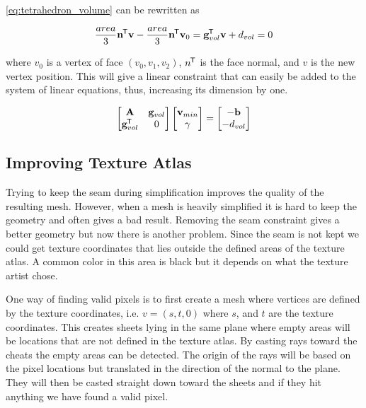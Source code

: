 \cref{eq:tetrahedron_volume} can be rewritten as 

\begin{equation} \label{eq:tetrahedron_volume_rewritten}
\frac{area}{3} \mathbf{n}^{\mkern-1.5mu\mathsf{T}} \mathbf{v} - \frac{area}{3} \mathbf{n}^{\mkern-1.5mu\mathsf{T}} \mathbf{v}_0 = \mathbf{g}_{vol}^{\mkern-1.5mu\mathsf{T}} \mathbf{v} + d_{vol} = 0
\end{equation}


where $v_0$ is a vertex of face $(v_0, v_1, v_2)$, $n^{\mkern-1.5mu\mathsf{T}}$ is the face normal, and $v$ is the new vertex position. This will give a linear constraint that can easily be added to the system of linear equations, thus, increasing its dimension by one.

\begin{equation} \label{eq:volume_constraint}
  \begin{bmatrix}
    \mathbf{A}                & \mathbf{g}_{vol} \\
     \mathbf{g}_{vol}^{\mkern-1.5mu\mathsf{T}} & 0
  \end{bmatrix}
  \begin{bmatrix}
    \mathbf{v}_{min} \\
    \gamma
  \end{bmatrix}
  =
  \begin{bmatrix}
    -\mathbf{b} \\
    -d_{vol}
  \end{bmatrix}
\end{equation}


\subsection{Improving Texture Atlas}
Trying to keep the seam during simplification improves the quality of the resulting mesh. However, when a mesh is heavily simplified it is hard to keep the geometry and often gives a bad result. Removing the seam constraint gives a better geometry but now there is another problem. Since the seam is not kept we could get texture coordinates that lies outside the defined areas of the texture atlas. A common color in this area is black but it depends on what the texture artist chose.

One way of finding valid pixels is to first create a mesh where vertices are defined by the texture coordinates, i.e. $v = (s, t, 0)$ where $s$, and $t$ are the texture coordinates. This creates sheets lying in the same plane where empty areas will be locations that are not defined in the texture atlas. By casting rays toward the cheats the empty areas can be detected. The origin of the rays will be based on the pixel locations but translated in the direction of the normal to the plane. They will then be casted straight down toward the sheets and if they hit anything we have found a valid pixel.

